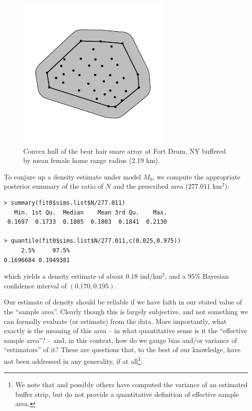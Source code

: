 \begin{figure}
\begin{center}
\includegraphics[height=3in,width=3in]{Ch3-Closed/figs/bufferedCH}
\end{center}
\caption{Convex hull of the bear hair snare array at Fort Drum, NY buffered by mean female
home range radius (2.19 km).}
\label{closed.fig.bch}
\end{figure}

To conjure up a
density estimate under model $M_0$, we compute the appropriate
posterior summary of the ratio of $N$ and the prescribed area ($277.011$ km$^2$):
{\small
\begin{verbatim}
> summary(fit0$sims.list$N/277.011)
   Min. 1st Qu.  Median    Mean 3rd Qu.    Max.
 0.1697  0.1733  0.1805  0.1803  0.1841  0.2130

> quantile(fit0$sims.list$N/277.011,c(0.025,0.975))
     2.5%     97.5%
0.1696684 0.1949381
\end{verbatim}
}
which yields a density estimate of about $0.18$ ind/km$^2$, and a $95\%$ Bayesian
confidence interval of $(0.170, 0.195)$.

Our estimate 
of density should be reliable  if we have faith in our
stated value of the ``sample area''. Clearly though this is largely
subjective, and not something we can formally evaluate (or estimate) from the data.
 More importantly, what exactly is
the meaning of this area -- in what quantitative sense is it the ``effective sample
area''? -- and, in this context, how do we gauge bias
and/or variance of ``estimators'' of it? These are questions that, to
the best of our knowledge, have not been addressed in any generality,
if at all\footnote{We note that \citet{karanth_nichols:1998} and
  possibly others have computed 
  the variance of an estimated buffer strip, but do not provide a
  quantitative definition of effective sample area.}. 

